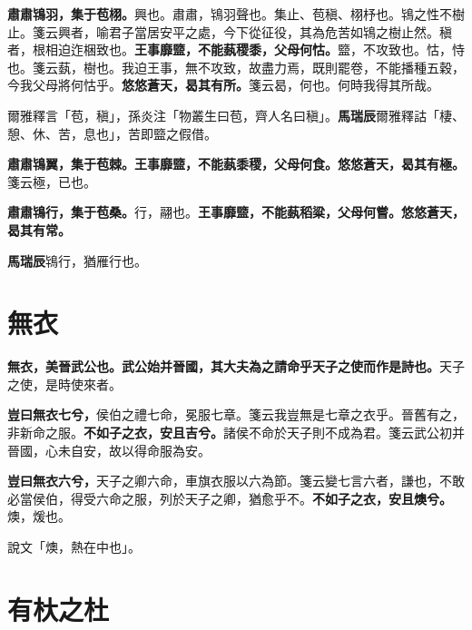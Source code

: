 \textbf{肅肅鴇羽，集于苞栩。}{\footnotesize 興也。肅肅，鴇羽聲也。集止、苞稹、栩杼也。鴇之性不樹止。箋云興者，喻君子當居安平之處，今下從征役，其為危苦如鴇之樹止然。稹者，根相迫迮梱致也。}\textbf{王事靡盬，不能蓺稷黍，父母何怙。}{\footnotesize 盬，不攻致也。怙，恃也。箋云蓺，樹也。我迫王事，無不攻致，故盡力焉，既則罷卷，不能播種五穀，今我父母將何怙乎。}\textbf{悠悠蒼天，曷其有所。}{\footnotesize 箋云曷，何也。何時我得其所哉。}

\begin{quoting}爾雅釋言「苞，稹」，孫炎注「物叢生曰苞，齊人名曰稹」。\textbf{馬瑞辰}爾雅釋詁「棲、憩、休、苦，息也」，苦即盬之假借。\end{quoting}

\textbf{肅肅鴇翼，集于苞棘。王事靡盬，不能蓺黍稷，父母何食。悠悠蒼天，曷其有極。}{\footnotesize 箋云極，已也。}

\textbf{肅肅鴇行，集于苞桑。}{\footnotesize 行，翮也。}\textbf{王事靡盬，不能蓺稻粱，父母何嘗。悠悠蒼天，曷其有常。}

\begin{quoting}\textbf{馬瑞辰}鴇行，猶雁行也。\end{quoting}

\section{無衣}


\textbf{無衣，美晉武公也。武公始并晉國，其大夫為之請命乎天子之使而作是詩也。}{\footnotesize 天子之使，是時使來者。}

\textbf{豈曰無衣七兮，}{\footnotesize 侯伯之禮七命，冕服七章。箋云我豈無是七章之衣乎。晉舊有之，非新命之服。}\textbf{不如子之衣，安且吉兮。}{\footnotesize 諸侯不命於天子則不成為君。箋云武公初并晉國，心未自安，故以得命服為安。}

\textbf{豈曰無衣六兮，}{\footnotesize 天子之卿六命，車旗衣服以六為節。箋云變七言六者，謙也，不敢必當侯伯，得受六命之服，列於天子之卿，猶愈乎不。}\textbf{不如子之衣，安且燠兮。}{\footnotesize 燠，煖也。}

\begin{quoting}說文「燠，熱在中也」。\end{quoting}

\section{有杕之杜}


